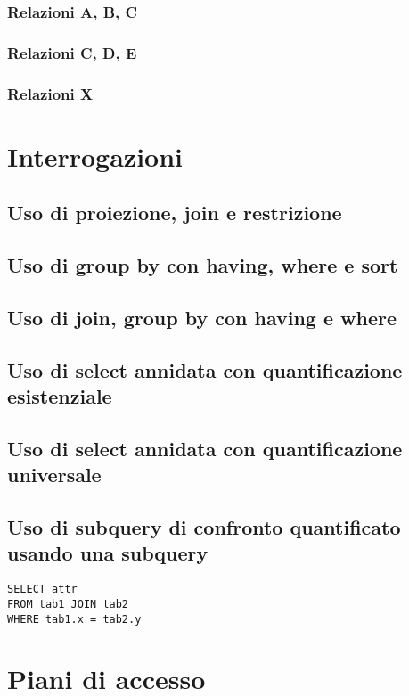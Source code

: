 \documentclass[a4paper,12pt]{article}
\begin{document}
 \subsubsection{ Relazioni A, B, C }

 \subsubsection{ Relazioni C, D, E }

 \subsubsection{ Relazioni X }

 \section{ Interrogazioni }

 \subsection{ Uso di proiezione, join e restrizione }
 \subsection{ Uso di group by con having, where e sort }
 \subsection{ Uso di join, group by con having e where }
 \subsection{ Uso di select annidata con quantificazione esistenziale }
 \subsection{ Uso di select annidata con quantificazione universale }
 \subsection{ Uso di subquery di confronto quantificato usando una subquery }

\begin{lstlisting}[caption=esempio]
SELECT attr
FROM tab1 JOIN tab2
WHERE tab1.x = tab2.y
\end{lstlisting}

 \section{ Piani di accesso }
\end{document}
